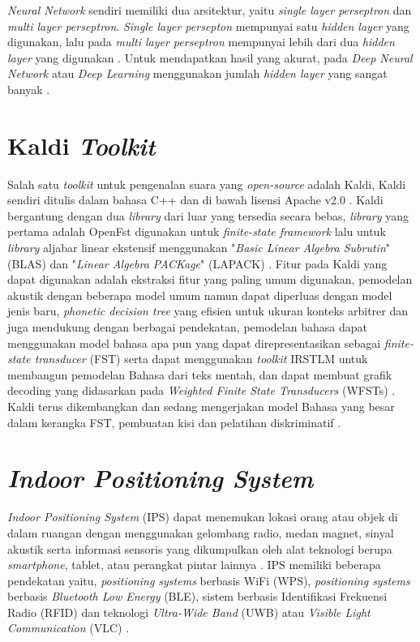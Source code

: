 \par \textit{Neural Network} sendiri memiliki dua arsitektur, yaitu \textit{single layer perseptron} dan \textit{multi layer perseptron}. \textit{Single layer persepton} mempunyai satu \textit{hidden layer} yang digunakan, lalu pada \textit{multi layer perseptron} mempunyai lebih dari dua \textit{hidden layer} yang digunakan \citep{laksono2018}. Untuk mendapatkan hasil yang akurat, pada \textit{Deep Neural Network} atau \textit{Deep Learning} menggunakan jumlah \textit{hidden layer} yang sangat banyak \citep{laksono2018}.

\section{Kaldi \textit{Toolkit}}
Salah satu \textit{toolkit} untuk pengenalan suara yang \textit{open-source} adalah Kaldi, Kaldi sendiri ditulis dalam bahasa C++ dan di bawah lisensi Apache v2.0 \citep{povey2011}. Kaldi bergantung dengan dua \textit{library} dari luar yang tersedia secara bebas, \textit{library} yang pertama adalah OpenFst digunakan untuk \textit{finite-state framework} lalu untuk \textit{library} aljabar linear ekstensif menggunakan "\textit{Basic Linear Algebra Subrutin}" (BLAS) dan "\textit{Linear Algebra PACKage}" (LAPACK) \citep{povey2011}. Fitur pada Kaldi yang dapat digunakan adalah ekstraksi fitur yang paling umum digunakan, pemodelan akustik dengan beberapa model umum namun dapat diperluas dengan model jenis baru, \textit{phonetic decision tree} yang efisien untuk ukuran konteks arbitrer dan juga mendukung dengan berbagai pendekatan, pemodelan bahasa dapat menggunakan model bahasa apa pun yang dapat direpresentasikan sebagai \textit{finite-state transducer} (FST) serta dapat menggunakan \textit{toolkit} IRSTLM untuk membangun pemodelan Bahasa dari teks mentah, dan dapat membuat grafik decoding yang didasarkan pada \textit{Weighted Finite State Transducers} (WFSTs) \citep{povey2011}. Kaldi terus dikembangkan dan sedang mengerjakan model Bahasa yang besar dalam kerangka FST, pembuatan kisi dan pelatihan diskriminatif \citep{povey2011}.

\section{\textit{Indoor Positioning System}}
\textit{Indoor Positioning System} (IPS) dapat menemukan lokasi orang atau objek di dalam ruangan dengan menggunakan gelombang radio, medan magnet, sinyal akustik serta informasi sensoris yang dikumpulkan oleh alat teknologi berupa \textit{smartphone}, tablet, atau perangkat pintar lainnya \citep{atlas2016}. IPS memiliki beberapa pendekatan yaitu, \textit{positioning systems} berbasis WiFi (WPS), \textit{positioning systems} berbasis \textit{Bluetooth Low Energy} (BLE), sistem berbasis Identifikasi Frekuensi Radio (RFID) dan teknologi \textit{Ultra-Wide Band} (UWB) atau \textit{Visible Light Communication} (VLC) \citep{canton2017}.

